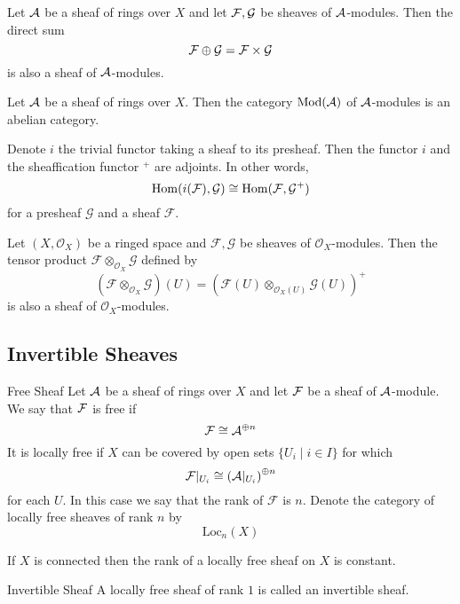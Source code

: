 \documentclass[a4paper]{article}
\begin{document}
\begin{prp}{}{} Let $\mathcal{A}$ be a sheaf of rings over $X$ and let $\mathcal{F},\mathcal{G}$ be sheaves of $\mathcal{A}$-modules. Then the direct sum $$\mathcal{F}\oplus\mathcal{G}=\mathcal{F}\times\mathcal{G}$$ is also a sheaf of $\mathcal{A}$-modules. 
\end{prp}

\begin{thm}{}{} Let $\mathcal{A}$ be a sheaf of rings over $X$. Then the category $\text{Mod}(\mathcal{A})$ of $\mathcal{A}$-modules is an abelian category. 
\end{thm}

\begin{prp}{}{} Denote $i$ the trivial functor taking a sheaf to its presheaf. Then the functor $i$ and the sheaffication functor $^+$ are adjoints. In other words, $$\operatorname{Hom}(i(\mathcal{F}),\mathcal{G})\cong\operatorname{Hom}(\mathcal{F},\mathcal{G}^+)$$ for a presheaf $\mathcal{G}$ and a sheaf $\mathcal{F}$. 
\end{prp}

\begin{prp}{}{} Let $(X,\mathcal{O}_X)$ be a ringed space and $\mathcal{F},\mathcal{G}$ be sheaves of $\mathcal{O}_X$-modules. Then the tensor product $\mathcal{F}\otimes_{\mathcal{O}_X}\mathcal{G}$ defined by $$(\mathcal{F}\otimes_{\mathcal{O}_X}\mathcal{G})(U)=(\mathcal{F}(U)\otimes_{\mathcal{O}_X(U)}\mathcal{G}(U))^+$$ is also a sheaf of $\mathcal{O}_X$-modules. 
\end{prp}

\subsection{Invertible Sheaves}
\begin{defn}{Free Sheaf}{} Let $\mathcal{A}$ be a sheaf of rings over $X$ and let $\mathcal{F}$ be a sheaf of $\mathcal{A}$-module. We say that $\mathcal{F}$ is free if $$\mathcal{F}\cong\mathcal{A}^{\oplus n}$$ It is locally free if $X$ can be covered by open sets $\{U_i\;|\;i\in I\}$ for which $$\mathcal{F}|_{U_i}\cong\left(\mathcal{A}|_{U_i}\right)^{\oplus n}$$ for each $U$. In this case we say that the rank of $\mathcal{F}$ is $n$. Denote the category of locally free sheaves of rank $n$ by $$\text{Loc}_n(X)$$
\end{defn}

\begin{lmm}{}{} If $X$ is connected then the rank of a locally free sheaf on $X$ is constant. 
\end{lmm}

\begin{defn}{Invertible Sheaf}{} A locally free sheaf of rank $1$ is called an invertible sheaf. 
\end{defn}
\end{document}
